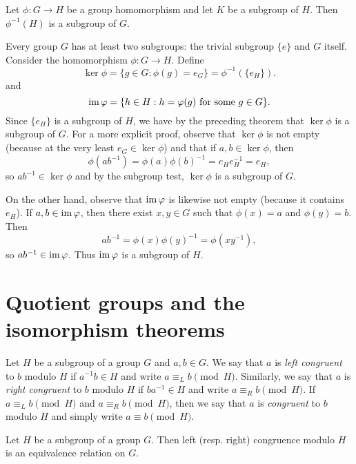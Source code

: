 \begin{theorem}
    Let \(\phi: G \to H\) be a group homomorphism and let \(K\) be a subgroup of
    \(H\). Then \(\phi^{-1}(H)\) is a subgroup of \(G\).
\end{theorem}


Every group \(G\) has at least two subgroups: the trivial subgroup \(\{e\}\) and
\(G\) itself. Consider the homomorphism \(\phi: G \to H\). Define
\[
    \ker \phi = \{g \in G : \phi(g) = e_G\} = \phi^{-1}(\{e_H\}).
\]
and
\[
    \operatorname{im} \varphi = \{h \in H : h = \varphi(g) \text{ for some } g \in G\}.
\]
Since \(\{e_H\}\) is a subgroup of \(H\), we have by the preceding theorem that
\(\ker \phi\) is a subgroup of \(G\). For a more explicit proof, observe that
\(\ker \phi\) is not empty (because at the very least \(e_G \in \ker \phi\)) and
that if \(a, b \in \ker \phi\), then 
\[
    \phi(ab^{-1}) = \phi(a)\phi(b)^{-1} = e_H e_H^{-1} = e_H,
\]
so \(ab^{-1} \in \ker \phi\) and by the subgroup test, \(\ker \phi\) is a
subgroup of \(G\).

On the other hand, observe that \(\operatorname{im} \varphi\) is likewise not empty (because it
contains \(e_H\)). If \(a, b \in \operatorname{im} \varphi\), then there exist \(x, y \in G\)
such that \(\phi(x) = a\) and \(\phi(y) = b\). Then
\[
    ab^{-1} = \phi(x)\phi(y)^{-1} = \phi(xy^{-1}),
\]
so \(ab^{-1} \in \operatorname{im} \varphi\). Thus \(\operatorname{im} \varphi\) is a subgroup of \(H\).


\section{Quotient groups and the isomorphism theorems}

\begin{definition}
    Let \(H\) be a subgroup of a group \(G\) and \(a, b \in G\). We say that
    \(a\) is \emph{left congruent} to \(b\) modulo \(H\) if \(a^{-1}b \in H\)
    and write \(a \equiv_L b \pmod{H}\). Similarly, we say that \(a\) is
    \emph{right congruent} to \(b\) modulo \(H\) if \(ba^{-1} \in H\) and write
    \(a \equiv_R b \pmod{H}\). If \(a \equiv_L b \pmod{H}\) and \(a \equiv_R b
    \pmod{H}\), then we say that \(a\) is \emph{congruent} to \(b\) modulo \(H\)
    and simply write \(a \equiv b \pmod{H}\).
\end{definition}

\begin{theorem}
    Let \(H\) be a subgroup of a group \(G\). Then left (resp. right) congruence
    modulo \(H\) is an equivalence relation on \(G\).
\end{theorem}

